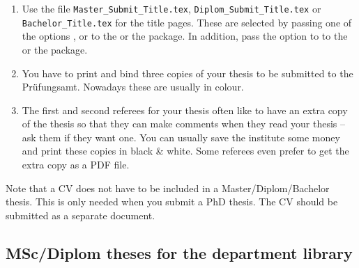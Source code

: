 \begin{enumerate}
\item Use the file \texttt{Master\_Submit\_Title.tex},
  \texttt{Diplom\_Submit\_Title.tex} or\\
  \texttt{Bachelor\_Title.tex} for the title pages.
  These are selected by passing one of the options
  ,  or 
  to the  or the  package.
  In addition, pass the option  to 
  to the  or the  package.
\item You have to print and bind three copies of your thesis
  to be submitted to the
  \foreignlanguage{ngerman}{Prüfungsamt}. Nowadays these are usually in
  colour.
\item The first and second referees for your thesis often like to
  have an extra copy of the thesis so that they can make comments when they read
  your thesis -- ask them if they want one. You can usually save the
  institute some money and print these copies in black \& white.
  Some referees even prefer to get the extra copy as a PDF file.
\end{enumerate}

Note that a CV does not have to be included in a Master/Diplom/Bachelor
thesis. This is only needed when you submit a PhD thesis.
The CV should be submitted as a separate document.


\subsection{MSc/Diplom theses for the department library}

